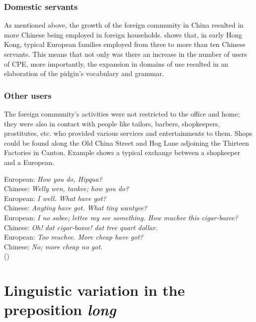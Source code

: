 \documentclass[output=paper]{langsci/langscibook}
\begin{document}
\subsubsection{Domestic servants}\label{sec:7:4.2.3}

As mentioned above, the growth of the foreign community in China resulted in more Chinese being employed in foreign households. \citet[309]{zhang_language_2009} shows that, in early Hong Kong, typical European families employed from three to more than ten Chinese servants. This means that not only was there an increase in the number of users of CPE, more importantly, the expansion in domains of use resulted in an elaboration of the pidgin’s vocabulary and grammar.

\subsubsection{Other users}\label{sec:7:4.2.4}

The foreign community’s activities were not restricted to the office and home; they were also in contact with people like tailors, barbers, shopkeepers, prostitutes, etc. who provided various services and entertainments to them. Shops could be found along the Old China Street and Hog Lane adjoining the Thirteen Factories in Canton. Example  shows a typical exchange between a shopkeeper and a European.

\ea
    \label{ex:7:4}
European: \textit{How you do, Hipqua?}\\
Chinese:  \textit{Welly wen, tankee; how you do?}\\
European: \textit{I well. What have got?}\\
Chinese:  \textit{Anyting have got. What ting wantyee?}\\
European: \textit{I no sabee; lettee my see something. How muchee this cigar-boxee?}\\
Chinese:  \textit{Oh! dat cigar-boxee! dat tree quart dollar.}\\
European: \textit{Too muchee. More cheap have got?}\\
Chinese:  \textit{No; more cheap no got.}\\

(\citealt[301]{duer_pigeon-english_1860})
\z

\section{Linguistic variation in the preposition \textit{long}}\label{sec:7:5}
\end{document}
